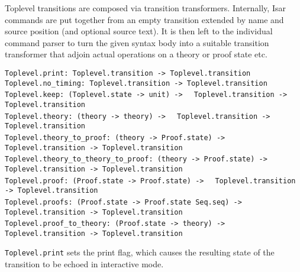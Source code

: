 \begin{isabellebody}
\begin{isamarkuptext}
  Toplevel transitions are composed via transition transformers.
  Internally, Isar commands are put together from an empty transition
  extended by name and source position (and optional source text).  It
  is then left to the individual command parser to turn the given
  syntax body into a suitable transition transformer that adjoin
  actual operations on a theory or proof state etc.%
\end{isamarkuptext}%
\isamarkuptrue%
%
\isadelimmlref
%
\endisadelimmlref
%
\isatagmlref
%
\begin{isamarkuptext}%
\begin{mldecls}
  \verb|Toplevel.print: Toplevel.transition -> Toplevel.transition| \\
  \verb|Toplevel.no_timing: Toplevel.transition -> Toplevel.transition| \\
  \verb|Toplevel.keep: (Toplevel.state -> unit) ->|\isasep\isanewline%
\verb|  Toplevel.transition -> Toplevel.transition| \\
  \verb|Toplevel.theory: (theory -> theory) ->|\isasep\isanewline%
\verb|  Toplevel.transition -> Toplevel.transition| \\
  \verb|Toplevel.theory_to_proof: (theory -> Proof.state) ->|\isasep\isanewline%
\verb|  Toplevel.transition -> Toplevel.transition| \\
  \verb|Toplevel.theory_to_theory_to_proof: (theory -> Proof.state) ->|\isasep\isanewline%
\verb|  Toplevel.transition -> Toplevel.transition| \\
  \verb|Toplevel.proof: (Proof.state -> Proof.state) ->|\isasep\isanewline%
\verb|  Toplevel.transition -> Toplevel.transition| \\
  \verb|Toplevel.proofs: (Proof.state -> Proof.state Seq.seq) ->|\isasep\isanewline%
\verb|  Toplevel.transition -> Toplevel.transition| \\
  \verb|Toplevel.proof_to_theory: (Proof.state -> theory) ->|\isasep\isanewline%
\verb|  Toplevel.transition -> Toplevel.transition| \\
  \end{mldecls}

  \begin{description}

  \item \verb|Toplevel.print| sets the print flag, which causes the
  resulting state of the transition to be echoed in interactive mode.


\end{description}
\end{isamarkuptext}
\end{isabellebody}
